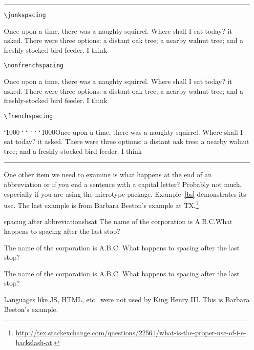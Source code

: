 \def\frenchspacing{\sfcode`\.1000 \sfcode`\?1000 \sfcode`\!1000
   \sfcode`\:1000 \sfcode`\;1000 \sfcode`\,1000}


 \let\tstory\frogking

\bigskip

\noindent\rule{\linewidth}{0.4pt}

\medskip
\narrower
{\hfill\hfill\small \texttt{\textbackslash junkspacing}}
\medskip


 \junkspacing Once upon a time, there was a naughty squirrel. Where shall I eat
     today? it asked. There were three options: a distant oak tree; a nearby 
    walnut tree; and a freshly-stocked bird feeder. I think\par

\bigskip

\smallskip
{\hfill\hfill\small \texttt{\textbackslash nonfrenchspacing}}

\medskip
\raggedright
     \nonfrenchspacing Once upon a time, there was a naughty squirrel. Where shall I eat
     today? it asked. There were three options: a distant oak tree; a nearby 
    walnut tree; and a freshly-stocked bird feeder. I think\par \par

\bigskip

\smallskip
{\hfill\hfill\noindent\small \texttt{\textbackslash frenchspacing}}

\medskip
     \frenchspacing Once upon a time, there was a naughty squirrel. Where shall I eat
     today? it asked. There were three options: a distant oak tree; a nearby 
    walnut tree; and a freshly-stocked bird feeder. I think\par \par

\medskip
\noindent\rule{\linewidth}{0.4pt}
\endgroup


One other item we need to examine is what happens at the end of an abbreviation or if you end a sentence with a capital letter? Probably not much, especially if you are using the microtype package. Example~\ref{bs} demonstrates its use. The last example is from Barbara Beeton's example at TX.\footnote{\url{http://tex.stackexchange.com/questions/22561/what-is-the-proper-use-of-i-e-backslash-at}.}

\begin{texexample}{spacing after abbreviations}{bsat}
The name of the corporation is A.B.C.What happens to spacing after the last stop?

The name of the corporation is A.B.C. What happens to spacing after the last stop?

The name of the corporation is A.B.C\@. What happens to spacing after the last stop?

Languages like JS, HTML, etc.\ were not used by King Henry III\@. This is Barbara Beeton's example.
\end{texexample}

